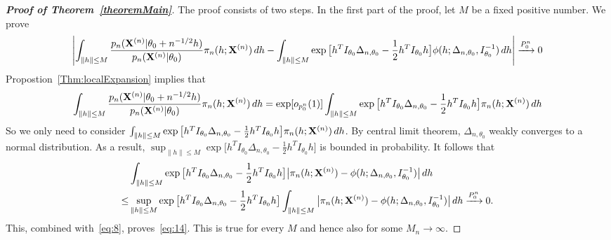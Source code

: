 \documentclass[3p]{elsarticle}
\theoremstyle{plain}
\theoremstyle{definition}
\theoremstyle{remark}
\begin{document}
\begin{appendices}
\begin{proof}[\textbf{Proof of Theorem~\ref{theoremMain}}]
The proof consists of two steps. In the first part of the proof, let  $M$ be a fixed positive number. We prove
\begin{equation}\label{eq:14}
    \left|\int_{\|h\|\leq M} \frac{p_n(\mathbf{X}^{(n)}|\theta_0+n^{-1/2}h)}{p_n(\mathbf{X}^{(n)}|\theta_0)}\pi_n (h;\mathbf{X}^{(n)}) \, dh-\int_{\|h\|\leq M} \exp\big[h^T I_{\theta_0}\Delta_{n,\theta_0}-\frac{1}{2}h^T I_{\theta_0}h\big] \phi(h;\Delta_{n,\theta_0},I_{\theta_0}^{-1})\, dh\right|
 \xrightarrow{P^n_0}0
\end{equation}
Propostion~\ref{Thm:localExpansion} implies that
\begin{equation}\label{eq:8}
    \int_{\|h\|\leq M} \frac{p_n(\mathbf{X}^{(n)}|\theta_0+n^{-1/2}h)}{p_n(\mathbf{X}^{(n)}|\theta_0)}\pi_n (h;\mathbf{X}^{(n)}) \, dh=
    \exp [o_{p^n_0}(1)]\int_{\|h\|\leq M} \exp\big[h^T I_{\theta_0}\Delta_{n,\theta_0}-\frac{1}{2}h^T I_{\theta_0}h\big]\pi_n (h;\mathbf{X}^{(n)}) \, dh
\end{equation}
    So we only need to consider $\int_{\|h\|\leq M} \exp\big[h^T I_{\theta_0}\Delta_{n,\theta_0}-\frac{1}{2}h^T I_{\theta_0}h\big]\pi_n (h;\mathbf{X}^{(n)}) \, dh$.
    By central limit theorem, $\Delta_{n,\theta_0}$ weakly converges to a normal distribution.
    As a result, $\sup_{\|h\|\leq M}\exp\big[h^T I_{\theta_0}\Delta_{n,\theta_0}-\frac{1}{2}h^T I_{\theta_0}h\big]$ is bounded in probability.
    It follows that
\begin{equation*}
\begin{aligned}
    &\int_{\|h\|\leq M} \exp\big[h^T I_{\theta_0}\Delta_{n,\theta_0}-\frac{1}{2}h^T I_{\theta_0}h\big] \big|\pi_n (h;\mathbf{X}^{(n)})-\phi(h;\Delta_{n,\theta_0},I_{\theta_0}^{-1})\big|\, dh
\\
    \leq& \sup_{\|h\|\leq M}\exp\big[h^T I_{\theta_0}\Delta_{n,\theta_0}-\frac{1}{2}h^T I_{\theta_0}h\big] 
    \int_{\|h\|\leq M}
    \big|\pi_n (h;\mathbf{X}^{(n)})-\phi(h;\Delta_{n,\theta_0},I_{\theta_0}^{-1})\big|\, dh
    \xrightarrow{P^n_0}0.
\end{aligned}
\end{equation*}
This, combined with~\eqref{eq:8}, proves~\eqref{eq:14}. 
This is true for every $M$ and hence also for some $M_n\to \infty$.


\end{proof}
\end{appendices}
\end{document}
